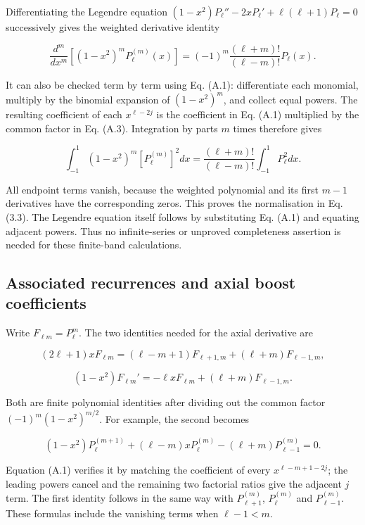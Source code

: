 \documentclass[
  11pt,
  a4paper]{article}
\begin{document}
Differentiating the Legendre equation \((1-x^2)P_\ell''-2xP_\ell'+\ell(\ell+1)P_\ell=0\) successively gives the weighted derivative identity

\[
\frac{d^m}{dx^m}\left[(1-x^2)^mP_\ell^{(m)}(x)\right]
=(-1)^m\frac{(\ell+m)!}{(\ell-m)!}P_\ell(x).
\tag{A.3}
\]

It can also be checked term by term using Eq. (A.1): differentiate each monomial, multiply by the binomial expansion of \((1-x^2)^m\), and collect equal powers. The resulting coefficient of each \(x^{\ell-2j}\) is the coefficient in Eq. (A.1) multiplied by the common factor in Eq. (A.3). Integration by parts \(m\) times therefore gives

\[
\int_{-1}^1(1-x^2)^m[P_\ell^{(m)}]^2dx
=\frac{(\ell+m)!}{(\ell-m)!}\int_{-1}^1P_\ell^2dx.
\tag{A.4}
\]

All endpoint terms vanish, because the weighted polynomial and its first \(m-1\) derivatives have the corresponding zeros. This proves the normalisation in Eq. (3.3). The Legendre equation itself follows by substituting Eq. (A.1) and equating adjacent powers. Thus no infinite-series or unproved completeness assertion is needed for these finite-band calculations.

\hypertarget{a.2-associated-recurrences-and-axial-boost-coefficients}{%
\subsection{Associated recurrences and axial boost coefficients}\label{a.2-associated-recurrences-and-axial-boost-coefficients}}

Write \(F_{\ell m}=P_\ell^m\). The two identities needed for the axial derivative are

\[
(2\ell+1)xF_{\ell m}
=(\ell-m+1)F_{\ell+1,m}+(\ell+m)F_{\ell-1,m},
\]

\[
(1-x^2)F_{\ell m}'
=-\ell xF_{\ell m}+(\ell+m)F_{\ell-1,m}.
\tag{A.5}
\]

Both are finite polynomial identities after dividing out the common factor \((-1)^m(1-x^2)^{m/2}\). For example, the second becomes

\[
(1-x^2)P_\ell^{(m+1)}
+(\ell-m)xP_\ell^{(m)}
-(\ell+m)P_{\ell-1}^{(m)}=0.
\tag{A.6}
\]

Equation (A.1) verifies it by matching the coefficient of every \(x^{\ell-m+1-2j}\); the leading powers cancel and the remaining two factorial ratios give the adjacent \(j\) term. The first identity follows in the same way with \(P_{\ell+1}^{(m)}\), \(P_\ell^{(m)}\) and \(P_{\ell-1}^{(m)}\). These formulas include the vanishing terms when \(\ell-1<m\).
\end{document}
